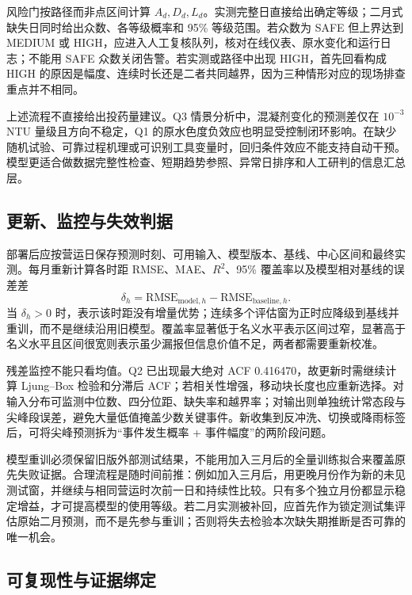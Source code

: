 \documentclass[UTF8,12pt,a4paper]{ctexart}
\newcommand{\Rtwo}{R^{2}}
\begin{document}
风险门按路径而非点区间计算 $A_d,D_d,L_d$。实测完整日直接给出确定等级；二月式缺失日同时给出众数、各等级概率和 95\% 等级范围。若众数为 SAFE 但上界达到 MEDIUM 或 HIGH，应进入人工复核队列，核对在线仪表、原水变化和运行日志；不能用 SAFE 众数关闭告警。若实测或路径中出现 HIGH，首先回看构成 HIGH 的原因是幅度、连续时长还是二者共同越界，因为三种情形对应的现场排查重点并不相同。

上述流程不直接给出投药量建议。Q3 情景分析中，混凝剂变化的预测差仅在 $10^{-3}$ NTU 量级且方向不稳定，Q1 的原水色度负效应也明显受控制闭环影响。在缺少随机试验、可靠过程机理或可识别工具变量时，回归条件效应不能支持自动干预。模型更适合做数据完整性检查、短期趋势参照、异常日排序和人工研判的信息汇总层。

\subsection{更新、监控与失效判据}

部署后应按营运日保存预测时刻、可用输入、模型版本、基线、中心区间和最终实测。每月重新计算各时距 RMSE、MAE、$\Rtwo$、95\% 覆盖率以及模型相对基线的误差差
\begin{equation}
\delta_h=\mathrm{RMSE}_{\mathrm{model},h}-
\mathrm{RMSE}_{\mathrm{baseline},h}.
\label{eq:monitor}
\end{equation}
当 $\delta_h>0$ 时，表示该时距没有增量优势；连续多个评估窗为正时应降级到基线并重训，而不是继续沿用旧模型。覆盖率显著低于名义水平表示区间过窄，显著高于名义水平且区间很宽则表示虽少漏报但信息价值不足，两者都需要重新校准。

残差监控不能只看均值。Q2 已出现最大绝对 ACF 0.416470，故更新时需继续计算 Ljung--Box 检验和分滞后 ACF；若相关性增强，移动块长度也应重新选择。对输入分布可监测中位数、四分位距、缺失率和越界率；对输出则单独统计常态段与尖峰段误差，避免大量低值掩盖少数关键事件。新收集到反冲洗、切换或降雨标签后，可将尖峰预测拆为“事件发生概率 + 事件幅度”的两阶段问题。

模型重训必须保留旧版外部测试结果，不能用加入三月后的全量训练拟合来覆盖原先失败证据。合理流程是随时间前推：例如加入三月后，用更晚月份作为新的未见测试窗，并继续与相同营运时次前一日和持续性比较。只有多个独立月份都显示稳定增益，才可提高模型的使用等级。若二月实测被补回，应首先作为锁定测试集评估原始二月预测，而不是先参与重训；否则将失去检验本次缺失期推断是否可靠的唯一机会。

\subsection{可复现性与证据绑定}
\end{document}
